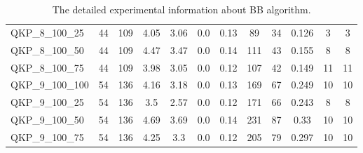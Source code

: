 \begin{table}[!h]
{\begin{tabular}{lccccccccccc}
QKP\_8\_100\_25 & 44 & 109 & 4.05 & 3.06 & 0.0 & 0.13 & 89 & 34 & 0.126 & 3 & 3\\
QKP\_8\_100\_50 & 44 & 109 & 4.47 & 3.47 & 0.0 & 0.14 & 111 & 43 & 0.155 & 8 & 8\\
QKP\_8\_100\_75 & 44 & 109 & 3.98 & 3.05 & 0.0 & 0.12 & 107 & 42 & 0.149 & 11 & 11\\
QKP\_9\_100\_100 & 54 & 136 & 4.16 & 3.18 & 0.0 & 0.13 & 169 & 67 & 0.249 & 10 & 10\\
QKP\_9\_100\_25 & 54 & 136 & 3.5 & 2.57 & 0.0 & 0.12 & 171 & 66 & 0.243 & 8 & 8\\
QKP\_9\_100\_50 & 54 & 136 & 4.69 & 3.69 & 0.0 & 0.14 & 231 & 87 & 0.33 & 10 & 10\\
QKP\_9\_100\_75 & 54 & 136 & 4.25 & 3.3 & 0.0 & 0.12 & 205 & 79 & 0.297 & 10 & 10\\
\bottomrule
\end{tabular}%
}%
\caption{The detailed experimental information about BB algorithm.}
\label{tab:table_$m}
\end{table}

